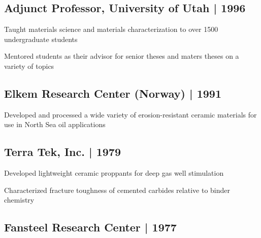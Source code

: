 \documentclass[letterpaper]{deedy-resume} %
\begin{document}
\begin{minipage}[t]{0.62\textwidth}
\sectionspace %

\subsection{Adjunct Professor, University of Utah | 1996}

\begin{tightitemize}
  \vspace{\topsep} %
  \item Taught materials science and materials characterization to
    over 1500 undergraduate students
  \item Mentored students as their advisor for senior theses and
    maters theses on a variety of topics
\end{tightitemize}

\sectionspace

\subsection{Elkem Research Center (Norway) | 1991}

\begin{tightitemize}
  \vspace{\topsep} %
  \item
    Developed and processed a wide variety of erosion-resistant ceramic materials for use in North Sea oil applications
\end{tightitemize}

\sectionspace %

\subsection{Terra Tek, Inc. | 1979}

\begin{tightitemize}
  \vspace{\topsep} %
\item
    Developed lightweight ceramic proppants for deep gas well stimulation
  \item
    Characterized fracture toughness of cemented carbides relative to binder chemistry
\end{tightitemize}

\sectionspace

\subsection{Fansteel Research Center | 1977}


\end{minipage}
\end{document}
